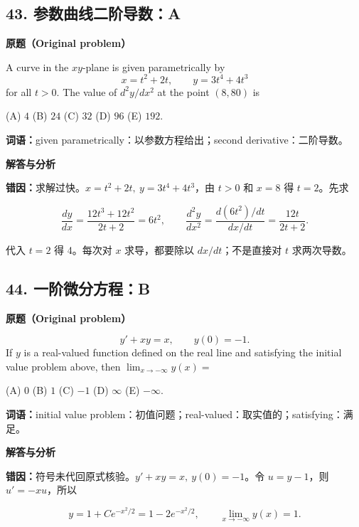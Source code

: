 \documentclass[11pt,a4paper,fontset=fandol]{ctexart}
\begin{document}
\hypertarget{ux53c2ux6570ux66f2ux7ebfux4e8cux9636ux5bfcux6570a}{%
\subsection{43.
参数曲线二阶导数：A}\label{ux53c2ux6570ux66f2ux7ebfux4e8cux9636ux5bfcux6570a}}

\textbf{原题（Original problem）}\par
A curve in the $xy$-plane is given parametrically by
\[x=t^2+2t,\qquad y=3t^4+4t^3\]
for all $t>0$. The value of $d^2y/dx^2$ at the point $(8,80)$ is

(A) $4$ \quad (B) $24$ \quad (C) $32$ \quad (D) $96$ \quad (E) $192$.

\textbf{词语：}given parametrically：以参数方程给出；second derivative：二阶导数。

\textbf{解答与分析}\par


\textbf{错因：}求解过快。\(x=t^2+2t,\ y=3t^4+4t^3\)，由 \(t>0\) 和
\(x=8\) 得 \(t=2\)。先求

\[\frac{dy}{dx}=\frac{12t^3+12t^2}{2t+2}=6t^2,\qquad \frac{d^2y}{dx^2}=\frac{d(6t^2)/dt}{dx/dt}=\frac{12t}{2t+2}.\]

代入 \(t=2\) 得 4。每次对 \(x\) 求导，都要除以 \(dx/dt\)；不是直接对
\(t\) 求两次导数。

\hypertarget{ux4e00ux9636ux5faeux5206ux65b9ux7a0bb}{%
\subsection{44.
一阶微分方程：B}\label{ux4e00ux9636ux5faeux5206ux65b9ux7a0bb}}

\textbf{原题（Original problem）}\par
\[y'+xy=x,\qquad y(0)=-1.\]
If $y$ is a real-valued function defined on the real line and satisfying the initial value problem above, then $\displaystyle\lim_{x\to-\infty}y(x)=$

(A) $0$ \quad (B) $1$ \quad (C) $-1$ \quad (D) $\infty$ \quad (E) $-\infty$.

\textbf{词语：}initial value problem：初值问题；real-valued：取实值的；satisfying：满足。

\textbf{解答与分析}\par


\textbf{错因：}符号未代回原式核验。\(y'+xy=x,\ y(0)=-1\)。令
\(u=y-1\)，则 \(u'=-xu\)，所以

\[y=1+Ce^{-x^2/2}=1-2e^{-x^2/2},\qquad \lim_{x\to-\infty}y(x)=1.\]
\end{document}
